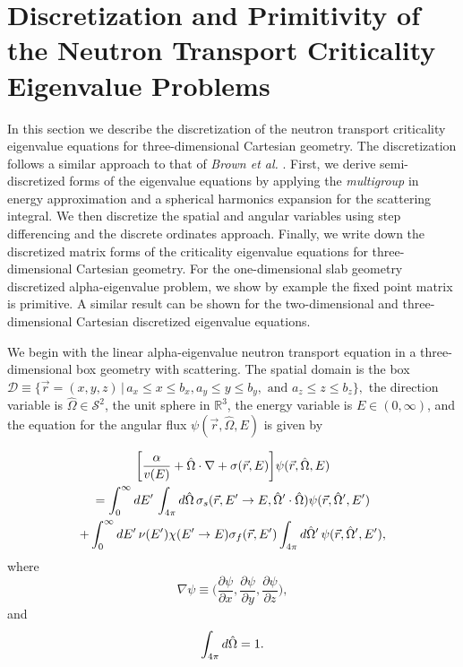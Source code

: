 \chapter{Discretization and Primitivity of the Neutron Transport Criticality Eigenvalue Problems}

In this section we describe the discretization of the neutron transport criticality eigenvalue equations for three-dimensional Cartesian geometry. The discretization follows a similar approach to that of \textit{Brown et al.} \cite{brown_linear_1995}. First, we derive semi-discretized forms of the eigenvalue equations by applying the \textit{multigroup} in energy approximation and a spherical harmonics expansion for the scattering integral. We then discretize the spatial and angular variables using step differencing and the discrete ordinates approach. Finally, we write down the discretized matrix forms of the criticality eigenvalue equations for three-dimensional Cartesian geometry. For the one-dimensional slab geometry discretized alpha-eigenvalue problem, we show by example the fixed point matrix is primitive. A similar result can be shown for the two-dimensional and three-dimensional Cartesian discretized eigenvalue equations.

We begin with the linear alpha-eigenvalue neutron transport equation in a three-dimensional box geometry with scattering. The spatial domain is the box $\mathcal{D} \equiv \{\vec{r} = (x, y, z) \, \vert \, a_{x} \leq x \leq b_{x}, a_{y} \leq y \leq b_{y}, \text{ and } a_{z} \leq z \leq b_{z} \},$ the direction variable is $\hat{\Omega} \in \mathcal{S}^{2}$, the unit sphere in $\mathbb{R}^{3}$, the energy variable is $E \in (0, \infty)$, and the equation for the angular flux $\psi(\vec{r}, \hat{\Omega}, E)$ is given by

\begin{multline}
	\bigg [ \frac{\alpha}{v(E)} + \hat{\Omega} \cdot \nabla + \sigma(\vec{r},E) \bigg ] \psi(\vec{r},\hat{\Omega},E) \\ = \int_{0}^{\infty} \mathop{}\!d E' \, \int_{4\pi} \mathop{}\!d \hat{\Omega} \, \sigma_{s}(\vec{r},E'\rightarrow E,\hat{\Omega}' \cdot \hat{\Omega}) \psi(\vec{r},\hat{\Omega}',E') \\ + \int_{0}^{\infty} \mathop{}\!d E' \, \nu(E') \chi(E'\rightarrow E) \sigma_{f}(\vec{r},E') \int_{4\pi} \mathop{}\!d \hat{\Omega}' \, \psi(\vec{r},\hat{\Omega}',E'), 
	\label{eq:Alpha3DNeutronTransport}
\end{multline}
where
\begin{equation}
	\nabla \psi \equiv \bigg (\frac{\partial \psi}{\partial x}, \frac{\partial \psi}{\partial y}, \frac{\partial \psi}{\partial z} \bigg ),
\end{equation}
and
\begin{equation}
	 \int_{4\pi} \mathop{}\!d \hat{\Omega} = 1.
\end{equation}

